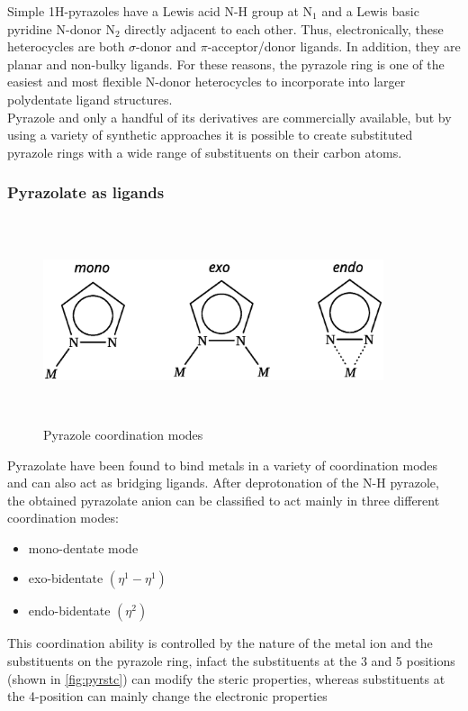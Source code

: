 \documentclass[../Master.tex]{subfiles}
\begin{document}
Simple 1H-pyrazoles have a Lewis acid N-H group at N$_1$ and a Lewis basic pyridine N-donor N$_2$ directly adjacent to each other. Thus, electronically, these heterocycles are both $\sigma$-donor and $\pi$-acceptor/donor ligands. In addition, they are planar and non-bulky ligands. For these reasons, the pyrazole ring is one of the easiest and most flexible N-donor heterocycles to incorporate into larger polydentate ligand structures. \\
Pyrazole and only a handful of its derivatives are commercially available, but by using a variety of synthetic approaches it is possible to create substituted pyrazole rings with a wide range of substituents on their carbon atoms.
\subsubsection{Pyrazolate as ligands}
\begin{figure}[h]
	\centering
	\includegraphics[width=10cm,height=6cm,keepaspectratio]{Structures/pyrazolecordmode.eps}
	\caption{Pyrazole coordination modes}\label{fig:pyrazole-cord-mode}
\end{figure}
Pyrazolate have been found to bind metals in a variety of coordination modes and can also act as bridging ligands.
After deprotonation of the N-H pyrazole, the obtained pyrazolate anion can be classified to act mainly in three different coordination modes:
\begin{itemize}
	\item  mono-dentate mode
	\item exo-bidentate \((\eta^{1}-\eta^{1})\)
	\item endo-bidentate \((\eta^{2})\)
\end{itemize}
This coordination ability is controlled by the nature of the metal ion and the substituents on the pyrazole ring, infact the substituents at the 3 and 5 positions (shown in \ref{fig:pyrstc}) can modify the steric properties, whereas substituents at the 4-position can mainly change the electronic properties
\end{document}
